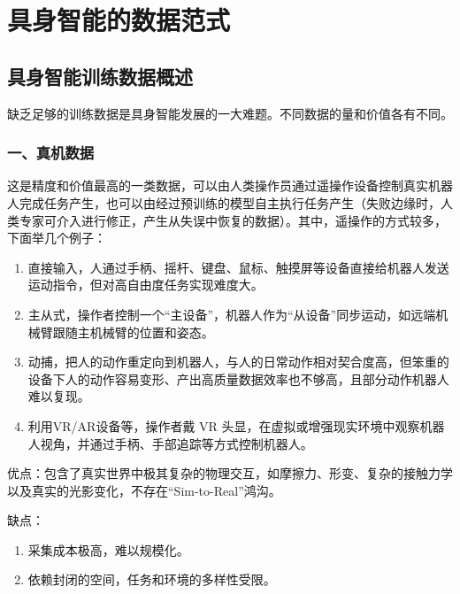 \hypertarget{ux5177ux8eabux667aux80fdux7684ux6570ux636eux8303ux5f0f}{%
\chapter{具身智能的数据范式}\label{ux5177ux8eabux667aux80fdux7684ux6570ux636eux8303ux5f0f}}

\hypertarget{ux5177ux8eabux667aux80fdux8badux7ec3ux6570ux636eux6982ux8ff0}{%
\section{具身智能训练数据概述}\label{ux5177ux8eabux667aux80fdux8badux7ec3ux6570ux636eux6982ux8ff0}}

缺乏足够的训练数据是具身智能发展的一大难题。不同数据的量和价值各有不同。

\hypertarget{ux4e00ux771fux673aux6570ux636e}{%
\subsection{一、真机数据}\label{ux4e00ux771fux673aux6570ux636e}}

这是精度和价值最高的一类数据，可以由人类操作员通过遥操作设备控制真实机器人完成任务产生，也可以由经过预训练的模型自主执行任务产生（失败边缘时，人类专家可介入进行修正，产生从失误中恢复的数据）。其中，遥操作的方式较多，下面举几个例子：

\begin{enumerate}
\def\labelenumi{\arabic{enumi}.}
\item
  直接输入，人通过手柄、摇杆、键盘、鼠标、触摸屏等设备直接给机器人发送运动指令，但对高自由度任务实现难度大。
\item
  主从式，操作者控制一个``主设备''，机器人作为``从设备''同步运动，如远端机械臂跟随主机械臂的位置和姿态。
\item
  动捕，把人的动作重定向到机器人，与人的日常动作相对契合度高，但笨重的设备下人的动作容易变形、产出高质量数据效率也不够高，且部分动作机器人难以复现。
\item
  利用VR/AR设备等，操作者戴 VR 头显，在虚拟或增强现实环境中观察机器人视角，并通过手柄、手部追踪等方式控制机器人。
\end{enumerate}

优点：包含了真实世界中极其复杂的物理交互，如摩擦力、形变、复杂的接触力学以及真实的光影变化，不存在``Sim-to-Real''鸿沟。

缺点：

\begin{enumerate}
\def\labelenumi{\arabic{enumi}.}
\item
  采集成本极高，难以规模化。
\item
  依赖封闭的空间，任务和环境的多样性受限。
\end{enumerate}


